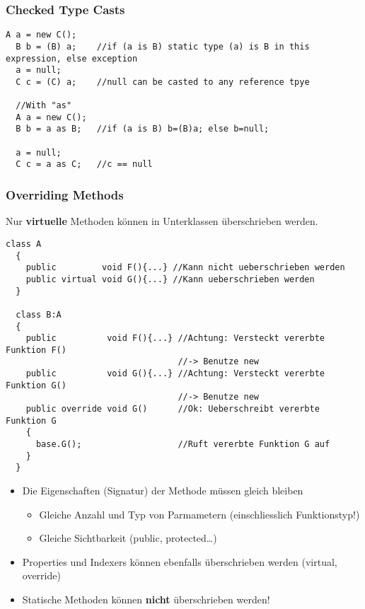 \subsubsection{Checked Type Casts}
\begin{lstlisting}[style=Csharp]
  A a = new C(); 
  B b = (B) a;    //if (a is B) static type (a) is B in this expression, else exception
  a = null; 
  C c = (C) a;    //null can be casted to any reference tpye
  
  //With "as"
  A a = new C();  
  B b = a as B;   //if (a is B) b=(B)a; else b=null;
  
  a = null; 
  C c = a as C;   //c == null
\end{lstlisting}

\subsubsection{Overriding Methods}
Nur \textbf{virtuelle} Methoden können in Unterklassen überschrieben werden. 
\begin{lstlisting}[style=Csharp]
  class A
  {
    public         void F(){...} //Kann nicht ueberschrieben werden 
    public virtual void G(){...} //Kann ueberschrieben werden
  }
  
  class B:A
  {
    public          void F(){...} //Achtung: Versteckt vererbte Funktion F()
                                  //-> Benutze new
    public          void G(){...} //Achtung: Versteckt vererbte Funktion G()
                                  //-> Benutze new
    public override void G()      //Ok: Ueberschreibt vererbte Funktion G
    {
      base.G();                   //Ruft vererbte Funktion G auf
    }
  }
\end{lstlisting}

\begin{itemize}
  \item Die Eigenschaften (Signatur) der Methode müssen gleich bleiben 
  \begin {itemize}
    \item Gleiche Anzahl und Typ von Parmametern (einschliesslich Funktionstyp!)
    \item Gleiche Sichtbarkeit (public, protected\ldots)
  \end{itemize}
  \item Properties und Indexers können ebenfalls überschrieben werden (virtual,
  override)
  \item Statische Methoden können \textbf{nicht} überschrieben werden!
\end{itemize}


